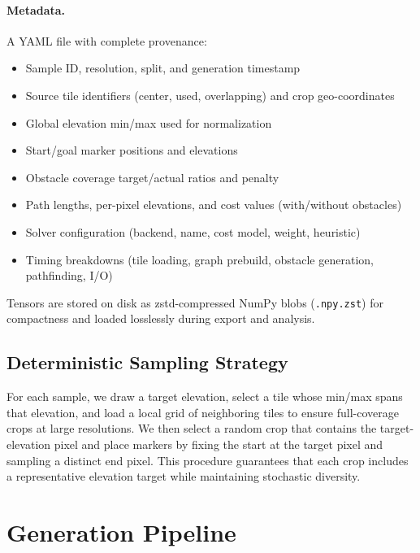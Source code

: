 \documentclass{article}
\begin{document}
\paragraph{Metadata.} A YAML file with complete provenance:
\begin{itemize}[noitemsep]
    \item Sample ID, resolution, split, and generation timestamp
    \item Source tile identifiers (center, used, overlapping) and crop geo-coordinates
    \item Global elevation min/max used for normalization
    \item Start/goal marker positions and elevations
    \item Obstacle coverage target/actual ratios and penalty
    \item Path lengths, per-pixel elevations, and cost values (with/without obstacles)
    \item Solver configuration (backend, name, cost model, weight, heuristic)
    \item Timing breakdowns (tile loading, graph prebuild, obstacle generation, pathfinding, I/O)
\end{itemize}

Tensors are stored on disk as zstd-compressed NumPy blobs (\texttt{.npy.zst}) for compactness and loaded losslessly during export and analysis.

\subsection{Deterministic Sampling Strategy}

For each sample, we draw a target elevation, select a tile whose min/max spans that elevation, and load a local grid of neighboring tiles to ensure full-coverage crops at large resolutions. We then select a random crop that contains the target-elevation pixel and place markers by fixing the start at the target pixel and sampling a distinct end pixel. This procedure guarantees that each crop includes a representative elevation target while maintaining stochastic diversity.

\section{Generation Pipeline}
\label{sec:pipeline}
\end{document}
